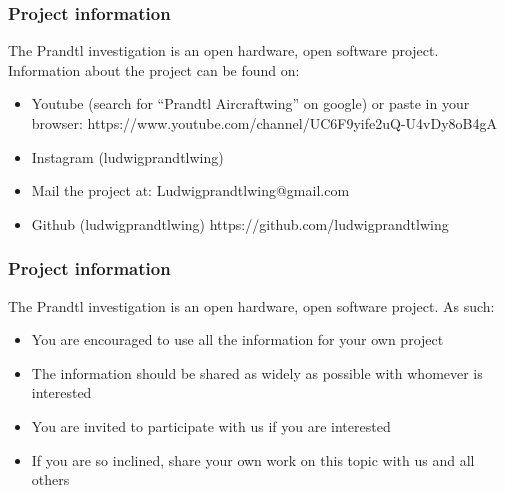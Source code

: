 \documentclass{beamer}
\begin{document}
\begin{frame}
\frametitle{Project information}

The Prandtl investigation is an open hardware, open software project.  Information about the project can be found on:  

\begin{itemize}
\item Youtube (search for ``Prandtl Aircraftwing'' on google) or paste in your browser:
https://www.youtube.com/channel/UC6F9yife2uQ-U4vDy8oB4gA
\item Instagram (ludwigprandtlwing)
\item Mail the project at: Ludwigprandtlwing@gmail.com 
\item Github (ludwigprandtlwing) https://github.com/ludwigprandtlwing
\end{itemize}

\end{frame}




\begin{frame}
\frametitle{Project information}

The Prandtl investigation is an open hardware, open software project.  As such:  

\begin{itemize}
\item You are encouraged to use all the information for your own project
\item The information should be shared as widely as possible with whomever is interested
\item You are invited to participate with us if you are interested
\item If you are so inclined, share your own work on this topic with us and all others
\end{itemize}

\end{frame}


\end{document}
